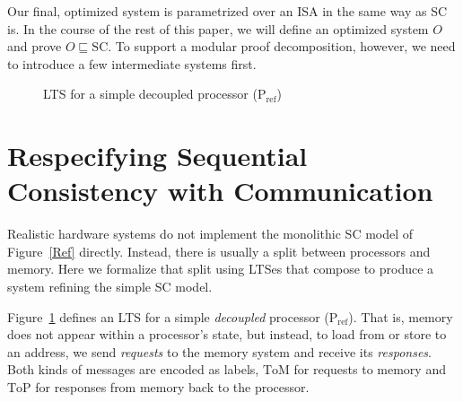 Our final, optimized system is parametrized over an ISA in the same way as SC is.
In the course of the rest of this paper, we will
define an optimized system $O$ and prove $O \sqsubseteq \text{SC}$.
To support a modular proof decomposition, however, we need to introduce a few
intermediate systems first.



\begin{figure}
\small
\centering
{}

\caption{LTS for a simple decoupled processor (P$_{\text{ref}}$)}
\label{Pref$}
\end{figure}


\section{Respecifying Sequential Consistency with Communication}\label{sec:ref}

Realistic hardware systems do not implement the monolithic SC model of
Figure~\ref{Ref} directly.  Instead, there is usually a split between
processors and memory. Here we formalize that split using LTSes that 
compose to produce a system refining the simple SC model.

Figure~\ref{Pref$} defines an LTS for a simple \emph{decoupled} processor
(P$_\text{ref}$).  That is, memory does not appear within a processor's state, but
instead, to load from or store to an address, we send \emph{requests} to the
memory system and receive its \emph{responses}.  Both kinds of messages are
encoded as labels, $\text{ToM}$ for requests to memory and $\text{ToP}$ for
responses from memory back to the processor.

